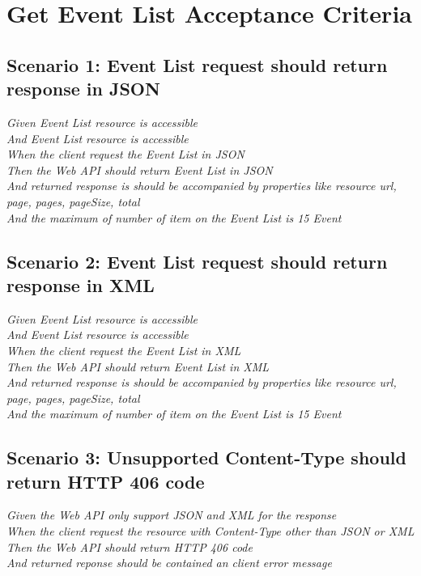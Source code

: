 \documentclass[a4paper, 12pt, oneside]{report}
\begin{document}
\section{Get Event List Acceptance Criteria}

\subsection{Scenario 1: Event List request should return response in JSON}

\onehalfspacing \textit{Given Event List resource is accessible\\
And Event List resource is accessible\\
When the client request the Event List in JSON\\
Then the Web API should return Event List in JSON\\
And returned response is should be accompanied by properties like resource url, page, pages, pageSize, total\\
And the maximum of number of item on the Event List is 15 Event}

\subsection{Scenario 2: Event List request should return response in XML}

\onehalfspacing \textit{Given Event List resource is accessible\\
And Event List resource is accessible\\
When the client request the Event List in XML\\
Then the Web API should return Event List in XML\\
And returned response is should be accompanied by properties like resource url, page, pages, pageSize, total\\
And the maximum of number of item on the Event List is 15 Event}

\subsection{Scenario 3: Unsupported Content-Type should return HTTP 406 code}

\onehalfspacing \textit{Given the Web API only support JSON and XML for the response\\
When the client request the resource with Content-Type other than JSON or XML\\
Then the Web API should return HTTP 406 code\\
And returned reponse should be contained an client error message}
\end{document}
